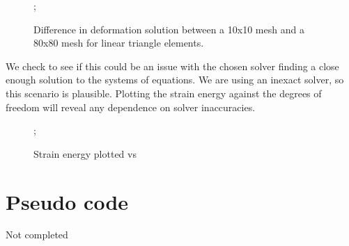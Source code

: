 \documentclass{article}
\begin{document}
\begin{figure}
    ;
    \caption{Difference in deformation solution between a 10x10 mesh and a 80x80 mesh for linear triangle elements.}
\centering
\end{figure}

We check to see if this could be an issue with the chosen solver finding a close enough solution to the systems of equations. We are using an inexact solver, so this scenario is plausible. Plotting the strain energy against the degrees of freedom will reveal any dependence on solver inaccuracies.

\begin{figure}
    ;
    \caption{Strain energy plotted vs }
\centering
\end{figure}



\FloatBarrier
\section{Pseudo code}

Not completed





\end{document}
